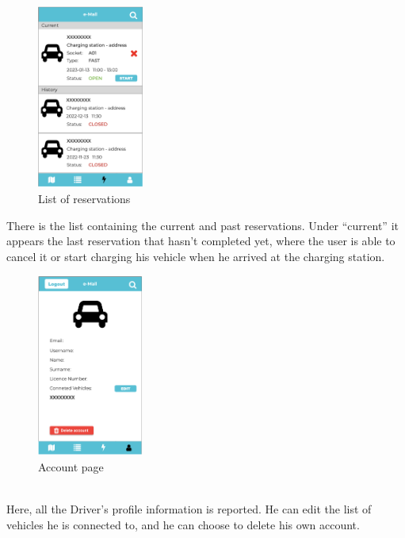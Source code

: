 \documentclass[../main.tex]{subfiles}
\begin{document}
\begin{figure}[!htb]
  \centering
  \begin{minipage}[b]{\textwidth}
  \centering
    \includegraphics[width=35mm]{Mockups/mk_dv_reservs.png}
    \caption{List of reservations}
    \label{fig:class}
  \end{minipage}
  \hfill
  \end{figure}
  \noindent
There is the list containing the current and past reservations. Under “current” it appears the last reservation that hasn’t completed yet, where the user is able to cancel it or start charging his vehicle when he arrived at the charging station.
  \begin{figure}[!htb]
\centering
  \begin{minipage}[b]{\textwidth}
  \centering
    \includegraphics[width=35mm]{Mockups/mk_dv_info.png}
    \caption{Account page}
    \label{fig:class}
  \end{minipage}
\end{figure}\\
Here, all the Driver's profile information is reported. He can edit the list of vehicles he is connected to, and he can choose to delete his own account. 
\clearpage
\newpage
\end{document}
